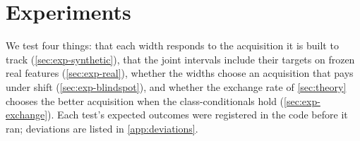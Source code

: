 \documentclass[twoside]{article}
\begin{document}
\begin{table}[t]
\centering\small
\caption{What each method provides. Guarantee: finite-sample inclusion at each budget. Acquisition:
a rule for choosing between kinds of data (REACH: heuristic under shift, \cref{sec:exp-blindspot};
radius-based under frozen class-conditionals, \cref{sec:exp-exchange}). $^\dagger$Prediction sets for
labels, with exact guarantees under known importance weights. $^\ddagger$Under frozen class-conditionals,
a data-free comparison of radii; it applies to the constraint region as well.}
\label{tab:related}
\setlength{\tabcolsep}{3pt}
\end{table}
\section{Experiments}
\label{sec:experiments}

We test four things: that each width responds to the acquisition it is built to track
(\cref{sec:exp-synthetic}), that the joint intervals include their targets on frozen real features
(\cref{sec:exp-real}), whether the widths choose an acquisition that pays under shift
(\cref{sec:exp-blindspot}), and whether the exchange rate of \cref{sec:theory} chooses the better
acquisition when the class-conditionals hold (\cref{sec:exp-exchange}). Each test's expected outcomes were registered in the code
before it ran; deviations are listed in \cref{app:deviations}.
\end{document}
